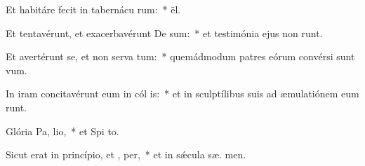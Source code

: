 \item Et habitáre fecit in tabernácu rum:~*  ël.
\item Et tentavérunt, et exacerbavérunt De sum:~* et testimónia ejus non runt.
\item Et avertérunt se, et non serva tum:~* quemádmodum patres eórum convérsi sunt   vum.
\item In iram concitavérunt eum in cól is:~* et in sculptílibus suis ad æmulatiónem eum runt.
\item Glória Pa,  lio,~* et Spi to.
\item Sicut erat in princípio, et ,  per,~* et in sǽcula sæ. men.
